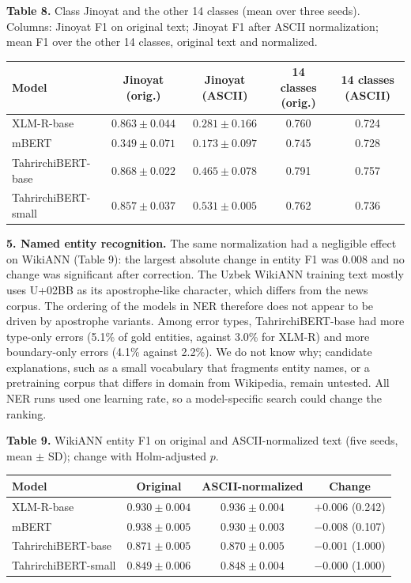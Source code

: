 \documentclass[11pt]{book}
\begin{document}
\begin{center}
\textbf{Table 8.} Class Jinoyat and the other 14 classes (mean over three seeds). Columns: Jinoyat F1 on original text; Jinoyat F1 after ASCII normalization; mean F1 over the other 14 classes, original text and normalized.\\[2pt]
\begin{tabular}{lcccc}
\hline
Model & Jinoyat (orig.) & Jinoyat (ASCII) & 14 classes (orig.) & 14 classes (ASCII) \\
\hline
XLM-R-base & $0.863\pm0.044$ & $0.281\pm0.166$ & 0.760 & 0.724 \\
mBERT & $0.349\pm0.071$ & $0.173\pm0.097$ & 0.745 & 0.728 \\
TahrirchiBERT-base & $0.868\pm0.022$ & $0.465\pm0.078$ & 0.791 & 0.757 \\
TahrirchiBERT-small & $0.857\pm0.037$ & $0.531\pm0.005$ & 0.762 & 0.736 \\
\hline
\end{tabular}
\end{center}

\textbf{5. Named entity recognition.} The same normalization had a negligible effect on WikiANN (Table 9): the largest absolute change in entity F1 was 0.008 and no change was significant after correction. The Uzbek WikiANN training text mostly uses U+02BB as its apostrophe-like character, which differs from the news corpus. The ordering of the models in NER therefore does not appear to be driven by apostrophe variants. Among error types, TahrirchiBERT-base had more type-only errors (5.1\% of gold entities, against 3.0\% for XLM-R) and more boundary-only errors (4.1\% against 2.2\%). We do not know why; candidate explanations, such as a small vocabulary that fragments entity names, or a pretraining corpus that differs in domain from Wikipedia, remain untested. All NER runs used one learning rate, so a model-specific search could change the ranking.

\begin{center}
\textbf{Table 9.} WikiANN entity F1 on original and ASCII-normalized text (five seeds, mean $\pm$ SD); change with Holm-adjusted $p$.\\[2pt]
\begin{tabular}{lccc}
\hline
Model & Original & ASCII-normalized & Change \\
\hline
XLM-R-base & $0.930\pm0.004$ & $0.936\pm0.004$ & $+0.006$ (0.242) \\
mBERT & $0.938\pm0.005$ & $0.930\pm0.003$ & $-0.008$ (0.107) \\
TahrirchiBERT-base & $0.871\pm0.005$ & $0.870\pm0.005$ & $-0.001$ (1.000) \\
TahrirchiBERT-small & $0.849\pm0.006$ & $0.848\pm0.004$ & $-0.000$ (1.000) \\
\hline
\end{tabular}
\end{center}
\end{document}
